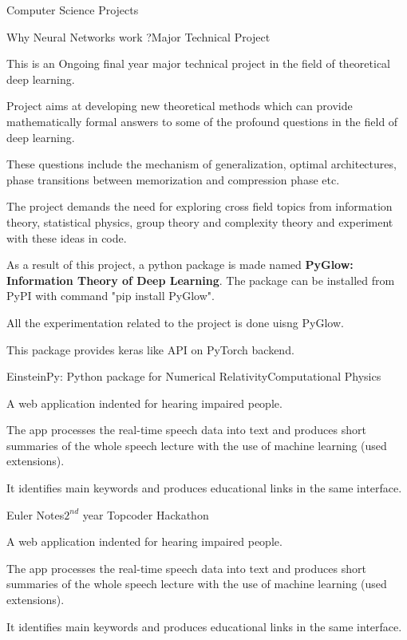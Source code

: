 \documentclass{resume} %
\begin{document}
\newpage
\begin{rSection}{Computer Science Projects}

\begin{rSubsection}{Why Neural Networks work ?}{Major Technical Project}{}{}
\item This is an Ongoing final year major technical project in the field of theoretical deep learning.
\item Project aims at developing new theoretical methods which can provide mathematically formal answers to some of the profound questions in the field of deep learning.
\item These questions include the mechanism of generalization, optimal architectures, phase transitions between memorization and compression phase etc.
\item The project demands the need for exploring cross field topics from information theory, statistical physics, group theory and complexity theory and experiment with these ideas in code.
\item As a result of this project, a python package is made named \textbf{PyGlow: Information Theory of Deep Learning}. The package can be installed from PyPI with command "pip install PyGlow".
\item All the experimentation related to the project is done uisng PyGlow. 
\item This package provides keras like API on PyTorch backend.
\end{rSubsection}

\begin{rSubsection}{EinsteinPy: Python package for Numerical Relativity}{Computational Physics}{}{}
\item A web application indented for hearing impaired people. 
\item The app processes the real-time speech data into text and produces short summaries of the whole speech lecture with the use of machine learning (used extensions). 
\item It identifies main keywords and produces educational links in the same interface.
\end{rSubsection}

\begin{rSubsection}{Euler Notes}{$2^{nd}$ year Topcoder Hackathon}{}{}
\item A web application indented for hearing impaired people. 
\item The app processes the real-time speech data into text and produces short summaries of the whole speech lecture with the use of machine learning (used extensions). 
\item It identifies main keywords and produces educational links in the same interface.
\end{rSubsection}

\end{rSection}
\end{document}
